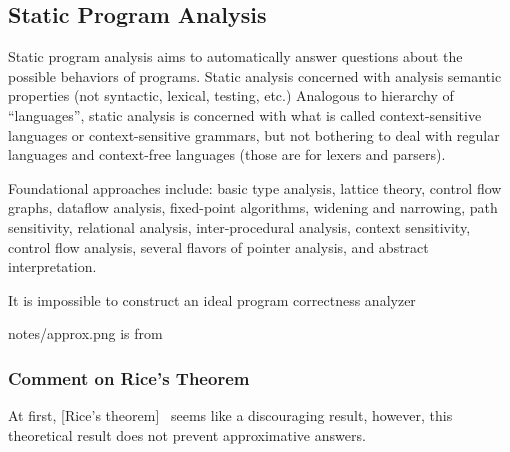 \subsection{Static Program Analysis}\label{subsec:static}

Static program analysis aims to automatically answer questions about the possible behaviors of programs.
Static analysis concerned with analysis semantic properties (not syntactic, lexical, testing, etc.)
Analogous to hierarchy of “languages”, static analysis is concerned with what is called context-sensitive languages or context-sensitive grammars, but not bothering to deal with regular languages and context-free languages (those are for lexers and parsers).

Foundational approaches include: basic type analysis, lattice theory, control flow graphs, dataflow analysis, fixed-point algorithms, widening and narrowing, path sensitivity, relational analysis, inter-procedural analysis, context sensitivity, control flow analysis, several flavors of pointer analysis, and abstract interpretation.

It is impossible to construct an ideal program correctness analyzer~\cite[p. 15]{moller2023}

notes/approx.png is from

\subsubsection{Comment on Rice's Theorem}

At first, [Rice's theorem]~\cite{rice1953} seems like a discouraging result, however, this theoretical result does not prevent approximative answers.

